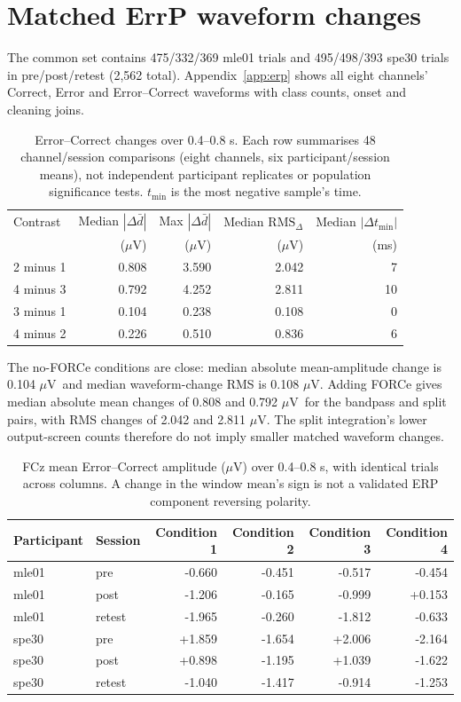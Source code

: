 \documentclass[11pt,a4paper]{article}
\newcommand{\uv}{\ensuremath{\mu\mathrm{V}}}
\begin{document}
\section{Matched ErrP waveform changes}
The common set contains 475/332/369 mle01 trials and 495/498/393 spe30 trials in pre/post/retest (2,562 total). Appendix~\ref{app:erp} shows all eight channels' Correct, Error and Error--Correct waveforms with class counts, onset and cleaning joins.
\begin{table}[H]\centering\small
\begin{tabular}{@{}lrrrr@{}}\toprule
Contrast & Median $|\Delta\bar d|$ & Max $|\Delta\bar d|$ & Median $\mathrm{RMS}_{\Delta}$ & Median $|\Delta t_{\min}|$\\
 & (\uv) & (\uv) & (\uv) & (ms)\\\midrule
2 minus 1 & 0.808 & 3.590 & 2.042 & 7 \\
4 minus 3 & 0.792 & 4.252 & 2.811 & 10 \\
3 minus 1 & 0.104 & 0.238 & 0.108 & 0 \\
4 minus 2 & 0.226 & 0.510 & 0.836 & 6 \\
\bottomrule\end{tabular}
\caption{Error--Correct changes over 0.4--0.8 s. Each row summarises 48 channel/session comparisons (eight channels, six participant/session means), not independent participant replicates or population significance tests. $t_{\min}$ is the most negative sample's time.}\label{tab:erpchanges}
\end{table}
The no-FORCe conditions are close: median absolute mean-amplitude change is 0.104 \uv\ and median waveform-change RMS is 0.108 \uv. Adding FORCe gives median absolute mean changes of 0.808 and 0.792 \uv\ for the bandpass and split pairs, with RMS changes of 2.042 and 2.811 \uv. The split integration's lower output-screen counts therefore do not imply smaller matched waveform changes.
\begin{table}[H]\centering\small
\begin{tabular}{@{}llrrrr@{}}\toprule
Participant & Session & Condition 1 & Condition 2 & Condition 3 & Condition 4\\\midrule
mle01 & pre & -0.660 & -0.451 & -0.517 & -0.454 \\
mle01 & post & -1.206 & -0.165 & -0.999 & +0.153 \\
mle01 & retest & -1.965 & -0.260 & -1.812 & -0.633 \\
spe30 & pre & +1.859 & -1.654 & +2.006 & -2.164 \\
spe30 & post & +0.898 & -1.195 & +1.039 & -1.622 \\
spe30 & retest & -1.040 & -1.417 & -0.914 & -1.253 \\
\bottomrule\end{tabular}
\caption{FCz mean Error--Correct amplitude (\uv) over 0.4--0.8 s, with identical trials across columns. A change in the window mean's sign is not a validated ERP component reversing polarity.}\label{tab:fcz}
\end{table}
\end{document}
